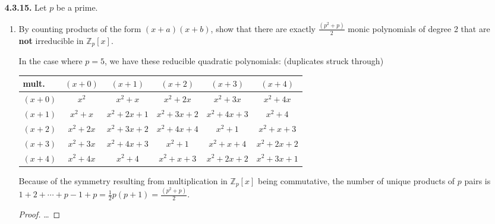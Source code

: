 \documentclass[12pt]{article}
\newcommand{\zee}{\mathbb{Z}}
\begin{document}
\begin{itemize}
\item[\textbf{ 4.3.15.}] Let $p$ be a prime.
\begin{enumerate}[(a.)]
  \item By counting products of the form $(x+a)(x+b)$, show that there are exactly $\frac{(p^2+p)}{2}$ monic polynomials of degree 2 that are \textbf{not} irreducible in $\zee_p[x]$.
  \par
  In the case where $p=5$, we have these reducible quadratic polynomials: (duplicates struck through)
  \par
  \renewcommand{\arraystretch}{1.5}
  \begin{tabular}{l | c c c c c}
    mult.     & $(x+0)$  & $(x+1)$         & $(x+2)$         & $(x+3)$         & $(x+4)$         \\
    \hline
    $(x+0)$   & $x^2$    & \st{$x^2+x$}    & \st{$x^2+2x$}   & \st{$x^2+3x$}   & \st{$x^2+4x$}   \\
    $(x+1)$   & $x^2+x$  & $x^2+2x+1$      & \st{$x^2+3x+2$} & \st{$x^2+4x+3$} & \st{$x^2+4$}    \\
    $(x+2)$   & $x^2+2x$ & $x^2+3x+2$      & $x^2+4x+4$      & \st{$x^2+1$}    & \st{$x^2+x+3$}  \\
    $(x+3)$   & $x^2+3x$ & $x^2+4x+3$      & $x^2+1$         & $x^2+x+4$       & \st{$x^2+2x+2$} \\
    $(x+4)$   & $x^2+4x$ & $x^2+4$         & $x^2+x+3$       & $x^2+2x+2$      & $x^2+3x+1$      \\
  \end{tabular}
  Because of the symmetry resulting from multiplication in $\zee_p[x]$ being commutative, the number of unique products of $p$ pairs is $1 + 2 + \dotsb + p-1 + p = \frac{1}{2}p(p+1) = \frac{(p^2+p)}{2}$.
  \begin{proof}
    \dots
  \end{proof}


\end{enumerate}
\end{itemize}
\end{document}
